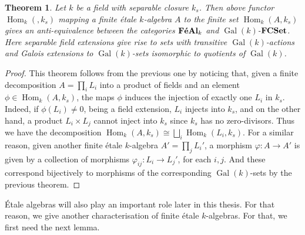 \documentclass{article}
\theoremstyle{plain}
\newtheorem{theorem}{Theorem}[subsection]
\theoremstyle{definition}
\DeclareMathOperator{\Hom}{Hom}
\DeclareMathOperator{\Gal}{Gal}
\DeclareMathOperator{\FCSet}{\bf{FCSet}}
\DeclareMathOperator{\FeAl}{\bf{F\acute{e}Al}}
\begin{document}
\begin{theorem}
\label{equivalence_catgory_etale_algebra}
    Let $k$ be a field with separable closure $k_s$. 
    Then above functor $\Hom_k( , k_s)$ mapping a finite \'etale $k$-algebra $A$ to the finite set $\Hom_k(A,k_s)$ gives an anti-equivalence between the categories $\FeAl_k$ and $\Gal(k)$-$\FCSet$.
    Here separable field extensions give rise to sets with transitive $\Gal(k)$-actions and
    Galois extensions to $\Gal(k)$-sets isomorphic to quotients of $\Gal(k)$.
\end{theorem}
\begin{proof}
    This theorem follows from the previous one by noticing that, given a finite decomposition $A = \prod_i L_i$ into a product of fields and an element $\phi \in \Hom_k(A,k_s)$, the maps $\phi$ induces the injection of exactly one $L_i$ in $k_s$.
    Indeed, if $\phi(L_i)\neq 0$, being a field extension, $L_i$ injects into $k_s$,
    and on the other hand, a product $L_i\times L_j$ cannot inject into $k_s$ since $k_s$ has no zero-divisors.
    Thus we have the decomposition $\Hom_k(A,k_s) \cong \bigsqcup_i \Hom_k(L_i,k_s)$.
    For a similar reason, given another finite \'etale $k$-algebra $A' = \prod_jL_i'$, a morphism $\varphi:A\rightarrow A'$ is given by a collection of morphisms $\varphi_{ij}:L_i\rightarrow L_j'$, for each $i,j$. 
    And these correspond bijectively to morphisms of the corresponding $\Gal(k)$-sets by the previous theorem.
\end{proof}

\noindent \'Etale algebras will also play an important role later in this thesis. 
For that reason, we give another characterisation of finite \'etale $k$-algebras.
For that, we first need the next lemma.
\end{document}
